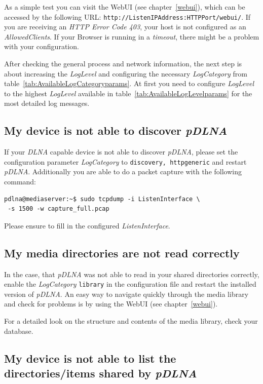 \documentclass[a4paper,oneside,10pt]{report}
\newenvironment{colframecmd}{%
  \begin{Sbox}
    \begin{minipage}{.99\columnwidth}
}{%
  \end{minipage}
  \end{Sbox}
  \begin{center}
    \fcolorbox{black}{LightSteelBlue}{\TheSbox}
  \end{center}
}
\begin{document}
As a simple test you can visit the WebUI (see chapter~\ref{webui}), which can be accessed by the following URL: \verb|http://ListenIPAddress:HTTPPort/webui/|. If you are receiving an {\em HTTP Error Code 403}, your host is not configured as an {\em AllowedClients}. If your Browser is running in a {\em timeout}, there might be a problem with your configuration.

After checking the general process and network information, the next step is about increasing the {\em LogLevel} and configuring the necessary {\em LogCategory} from table~\ref{tab:AvailableLogCategoryparams}. At first you need to configure {\em LogLevel} to the highest {\em LogLevel} available in table~\ref{tab:AvailableLogLevelparams} for the most detailed log messages.

\subsection{My device is not able to discover {\em pDLNA}}

If your {\em DLNA} capable device is not able to discover {\em pDLNA}, please set the configuration parameter {\em LogCategory} to \verb|discovery, httpgeneric| and restart {\em pDLNA}. Additionally you are able to do a packet capture with the following command:
\begin{colframecmd}
\begin{verbatim}
pdlna@mediaserver:~$ sudo tcpdump -i ListenInterface \
 -s 1500 -w capture_full.pcap
\end{verbatim}
\end{colframecmd}
Please ensure to fill in the configured {\em ListenInterface}.

\subsection{My media directories are not read correctly}

In the case, that {\em pDLNA} was not able to read in your shared directories correctly, enable the {\em LogCategory} \verb|library| in the configuration file and restart the installed version of {\em pDLNA}. An easy way to navigate quickly through the media library and check for problems is by using the WebUI (see chapter~\ref{webui}).

For a detailed look on the structure and contents of the media library, check your database.

\subsection{My device is not able to list the directories/items shared by {\em pDLNA}}
\end{document}

